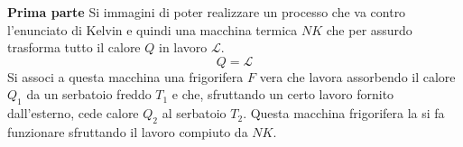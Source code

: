 \documentclass[10pt,a4paper]{book}
\begin{document}
\textbf{Prima parte} Si immagini di poter realizzare un processo che va contro l'enunciato di Kelvin e quindi una macchina termica $NK$ che per assurdo trasforma tutto il calore $Q$ in lavoro $\mathcal{L}$.
\[
	Q = \mathcal{L}
\]
Si associ a questa macchina una frigorifera $F$ vera che lavora assorbendo il calore $Q_1$ da un serbatoio freddo $T_1$ e che, sfruttando un certo lavoro fornito dall'esterno, cede calore $Q_2$ al serbatoio $T_2$. Questa macchina frigorifera la si fa funzionare sfruttando il lavoro compiuto da $NK$.
\begin{figure}[htpb]
	\centering
	


	\begin{tikzpicture}[x=0.75pt,y=0.75pt,yscale=-1,xscale=1]


\end{tikzpicture}
\end{figure}
\end{document}
